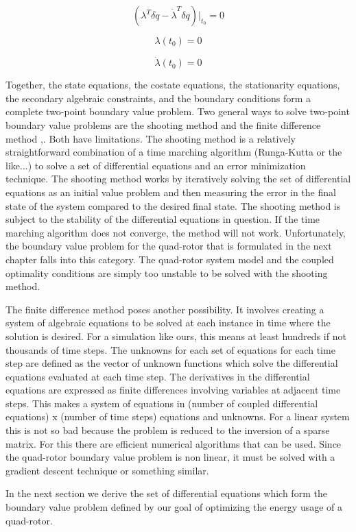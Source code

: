 \begin{equation}
    ( \lambda^T \delta \dot q - \dot \lambda^T \delta q )|_{t_0} = 0
\end{equation}

\begin{equation}
    \lambda(t_0) = 0
\end{equation}

\begin{equation}
    \dot \lambda(t_0) = 0
\end{equation}

Together, the state equations, the costate equations, the stationarity equations, the secondary algebraic constraints, and the boundary conditions form a complete two-point boundary value problem. Two general ways to solve two-point boundary value problems are the shooting method and the finite difference method \cite{keller1992numerical},\cite{rao2001applied}. Both have limitations. The shooting method is a relatively straightforward combination of a time marching algorithm (Runga-Kutta or the like...) to solve a set of differential equations and an error minimization technique. The shooting method works by iteratively solving the set of differential equations as an initial value problem and then measuring the error in the final state of the system compared to the desired final state. The shooting method is subject to the stability of the differential equations in question. If the time marching algorithm does not converge, the method will not work. Unfortunately, the boundary value problem for the quad-rotor that is formulated in the next chapter falls into this category. The quad-rotor system model and the coupled optimality conditions are simply too unstable to be solved with the shooting method. 

The finite difference method poses another possibility.\cite{rao2001applied} It involves creating a system of algebraic equations to be solved at each instance in time where the solution is desired. For a simulation like ours, this means at least hundreds if not thousands of time steps. The unknowns for each set of equations for each time step are defined as the vector of unknown functions which solve the differential equations evaluated at each time step. The derivatives in the differential equations are expressed as finite differences involving variables at adjacent time steps. This makes a system of equations in (number of coupled differential equations) x (number of time steps) equations and unknowns. For a linear system this is not so bad because the problem is reduced to the inversion of a sparse matrix. For this there are efficient numerical algorithms that can be used. Since the quad-rotor boundary value problem is non linear, it must be solved with a gradient descent technique or something similar.

In the next section we derive the set of differential equations which form the boundary value problem defined by our goal of optimizing the energy usage of a quad-rotor.  

    



